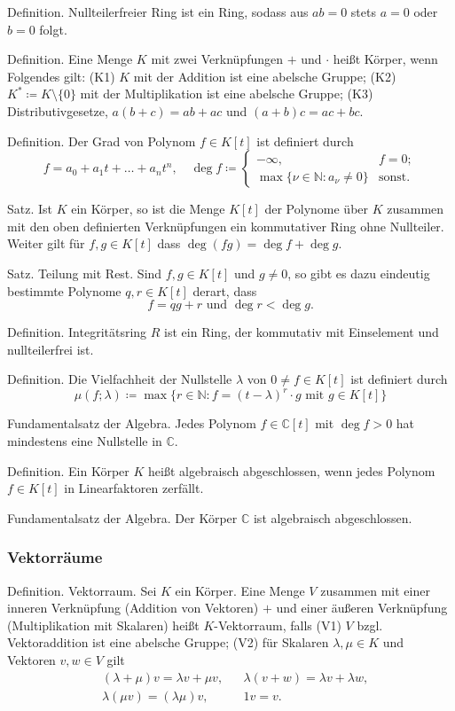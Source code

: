 \documentclass[fleqn,draft,a5paper]{article}
\begin{document}
Definition.  Nullteilerfreier Ring ist ein Ring, sodass aus \(ab=0\)
stets \(a=0\) oder \(b=0\) folgt.

Definition.  Eine Menge \(K\) mit zwei Verknüpfungen \(+\) und \(\cdot\) heißt
Körper, wenn Folgendes gilt: (K1) \(K\) mit der Addition ist eine
abelsche Gruppe; (K2) \(K^{\ast} \coloneq K \setminus \{0\}\) mit der Multiplikation ist
eine abelsche Gruppe; (K3) Distributivgesetze, \(a(b+c)=ab+ac\) und
\((a+b)c=ac + bc\).

Definition.  Der Grad von Polynom \(f \in K[t]\) ist definiert durch
\[
  f = a_{0} + a_{1}t + \ldots + a_{n}t^{n}, \quad
  \deg f \coloneq
  \begin{cases}
    -\infty, & f = 0; \\
    \max\{\nu \in \mathbb{N}\colon a_{\nu} \ne 0\} & \text{sonst.}
  \end{cases}
\]

Satz.  Ist \(K\) ein Körper, so ist die Menge \(K[t]\) der Polynome über
\(K\) zusammen mit den oben definierten Verknüpfungen ein kommutativer
Ring ohne Nullteiler.  Weiter gilt für \(f,g \in K[t]\) dass \(\deg (f g) =
\deg f + \deg g.\)

Satz.  Teilung mit Rest.  Sind \(f,g \in K[t]\) und \(g \ne 0\), so gibt es
dazu eindeutig bestimmte Polynome \(q,r \in K[t]\) derart, dass
\[f=qg+r \text{ und } \deg r < \deg g.\]

Definition.  Integritätsring \(R\) ist ein Ring, der kommutativ mit
Einselement und nullteilerfrei ist.

Definition.  Die Vielfachheit der Nullstelle \(\lambda\) von \(0 \ne f \in K[t]\)
ist definiert durch \[\mu(f; \lambda) \coloneq \max \{r \in \mathbb{N}\colon f = (t - \lambda)^{r} \cdot g
  \text{ mit } g \in K[t]\}\]

Fundamentalsatz der Algebra.  Jedes Polynom \(f \in \mathbb{C}[t]\) mit \(\deg f >
0\) hat mindestens eine Nullstelle in \(\mathbb{C}\).

Definition.  Ein Körper \(K\) heißt algebraisch abgeschlossen, wenn
jedes Polynom \(f \in K[t]\) in Linearfaktoren zerfällt.

Fundamentalsatz der Algebra.  Der Körper \(\mathbb{C}\) ist algebraisch abgeschlossen.

\subsubsection{Vektorräume}

Definition.  Vektorraum.  Sei \(K\) ein Körper.  Eine Menge \(V\) zusammen
mit einer inneren Verknüpfung (Addition von Vektoren) \(+\) und einer
äußeren Verknüpfung (Multiplikation mit Skalaren) heißt
\(K\)-Vektorraum, falls (V1) \(V\) bzgl. Vektoraddition ist eine abelsche
Gruppe; (V2) für Skalaren \(\lambda, \mu \in K\) und Vektoren \(v, w \in V\) gilt
\begin{align*}
  &(\lambda + \mu)v=\lambda v + \mu v, && \lambda(v+w) = \lambda v+ \lambda w, \\
  &\lambda(\mu v) = (\lambda \mu) v, && 1v = v.
\end{align*}
\end{document}
